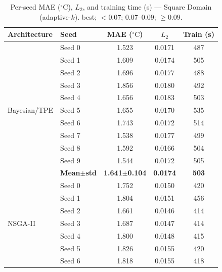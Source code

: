 \begin{table}[H]
\centering\small\setlength{\tabcolsep}{4pt}
\caption{Per-seed MAE ($^\circ\mathrm{C}$), $L_2$, and training time (s) --- Square Domain (adaptive-$k$).
\phantom{x} best; \phantom{x} ${<}0.07$; \phantom{x} $0.07$--$0.09$; \phantom{x} ${\geq}0.09$.}
\label{tab:adap_square_seeds}
\begin{tabular}{@{}llccc@{}}
\toprule
Architecture & Seed & MAE ($^\circ\mathrm{C}$) & $L_2$ & Train (s) \\
\midrule
\multirow{11}{*}{Bayesian/TPE}
  & Seed 0 & {\small 1.523} & {\small 0.0171} & {\small 487} \\
  & Seed 1 & {\small 1.609} & {\small 0.0174} & {\small 505} \\
  & Seed 2 & {\small 1.696} & {\small 0.0177} & {\small 488} \\
  & Seed 3 & {\small 1.856} & {\small 0.0180} & {\small 492} \\
  & Seed 4 & {\small 1.656} & {\small 0.0183} & {\small 503} \\
  & Seed 5 & {\small 1.655} & {\small 0.0170} & {\small 535} \\
  & Seed 6 & {\small 1.743} & {\small 0.0172} & {\small 514} \\
  & Seed 7 & {\small 1.538} & {\small 0.0177} & {\small 499} \\
  & Seed 8 & {\small 1.592} & {\small 0.0166} & {\small 504} \\
  & Seed 9 & {\small 1.544} & {\small 0.0172} & {\small 505} \\
  & \textbf{Mean$\pm$std} & \textbf{1.641$\pm$0.104} & \cellcolor{ForestGreen!25}\textbf{0.0174} & \textbf{503} \\
\midrule
\multirow{11}{*}{NSGA-II}
  & Seed 0 & {\small 1.752} & {\small 0.0150} & {\small 420} \\
  & Seed 1 & {\small 1.804} & {\small 0.0151} & {\small 456} \\
  & Seed 2 & {\small 1.661} & {\small 0.0146} & {\small 414} \\
  & Seed 3 & {\small 1.687} & {\small 0.0147} & {\small 414} \\
  & Seed 4 & {\small 1.800} & {\small 0.0148} & {\small 415} \\
  & Seed 5 & {\small 1.826} & {\small 0.0155} & {\small 420} \\
  & Seed 6 & {\small 1.818} & {\small 0.0155} & {\small 418} \\

\end{tabular}
\end{table}
